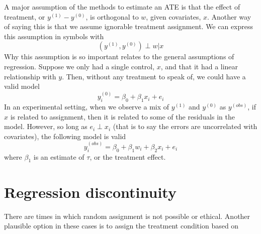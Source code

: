 A major assumption of the methods to estimate an ATE is that the effect of treatment, or $y^{\left(1\right)} - y^{\left(0\right)}$, is orthogonal to $w$, given covariates, $x$. Another way of saying this is that we assume ignorable treatment assignment. We can express this assumption in symbols with
\begin{equation}
\left(y^{\left(1\right)} , y^{\left(0\right)}\right) \perp w\vert x
\end{equation}
Why this assumption is so important relates to the general assumptions of regression. Suppose we only had a single control, $x$, and that it had a linear relationship with $y$. Then, without any treatment to speak of, we could have a valid model
\begin{equation}
y_i^{\left(0\right)}=\beta_0+\beta_1x_i+e_i
\end{equation}
In an experimental setting, when we observe a mix of $y^{\left(1\right)}$ and $y^{\left(0\right)}$ as $y^{\left(obs\right)}$, if $x$ is related to assignment, then it is related to some of the residuals in the model. However, so long as $e_i \perp x_i$ (that is to say the errors are uncorrelated with covariates), the following model is valid
\begin{equation}
y_i^{\left(obs\right)}=\beta_0+\beta_1w_i+\beta_2x_i+e_i
\end{equation}
where $\beta_1$ is an estimate of $\tau$, or the treatment effect.


\section{Regression discontinuity}

There are times in which random assignment is not possible or ethical. Another plausible option in these cases is to assign the treatment condition based on


